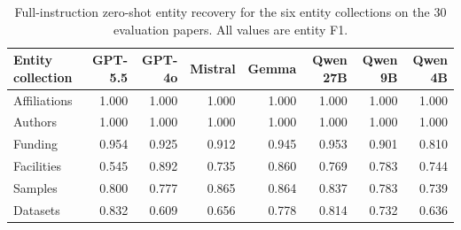 \begin{table}[!t]
  \centering
  \small
  \setlength{\tabcolsep}{2.5pt}
  \begin{tabular}{@{}p{}rrrrrrr@{}}
    \toprule
    Entity collection & GPT-5.5 & GPT-4o & Mistral & Gemma & Qwen 27B & Qwen 9B & Qwen 4B \\
    \midrule
    Affiliations & 1.000 & 1.000 & 1.000 & 1.000 & 1.000 & 1.000 & 1.000 \\
    Authors & 1.000 & 1.000 & 1.000 & 1.000 & 1.000 & 1.000 & 1.000 \\
    Funding & 0.954 & 0.925 & 0.912 & 0.945 & 0.953 & 0.901 & 0.810 \\
    Facilities & 0.545 & 0.892 & 0.735 & 0.860 & 0.769 & 0.783 & 0.744 \\
    Samples & 0.800 & 0.777 & 0.865 & 0.864 & 0.837 & 0.783 & 0.739 \\
    Datasets & 0.832 & 0.609 & 0.656 & 0.778 & 0.814 & 0.732 & 0.636 \\
    \bottomrule
  \end{tabular}
  \caption{Full-instruction zero-shot entity recovery for the six
  entity collections on the 30 evaluation papers. All values
  are entity F1.}
  \label{tab:zero-shot-recovery}
\end{table}
